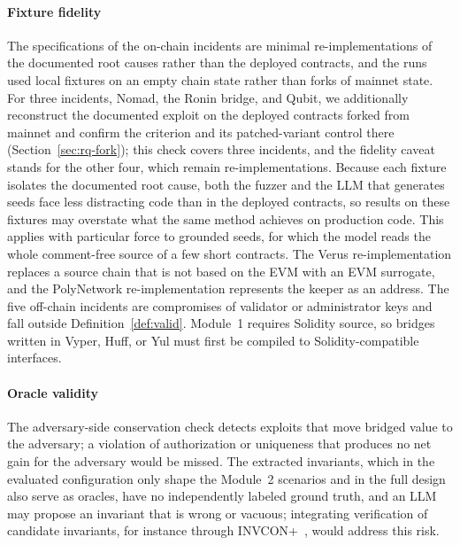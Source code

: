 \documentclass[a4paper]{cas-sc}
\begin{document}
\paragraph{Fixture fidelity}
The specifications of the on-chain incidents are minimal re-implementations of the documented root causes rather than the deployed contracts, and the runs used local fixtures on an empty chain state rather than forks of mainnet state. For three incidents, Nomad, the Ronin bridge, and Qubit, we additionally reconstruct the documented exploit on the deployed contracts forked from mainnet and confirm the criterion and its patched-variant control there (Section~\ref{sec:rq-fork}); this check covers three incidents, and the fidelity caveat stands for the other four, which remain re-implementations. Because each fixture isolates the documented root cause, both the fuzzer and the LLM that generates seeds face less distracting code than in the deployed contracts, so results on these fixtures may overstate what the same method achieves on production code. This applies with particular force to grounded seeds, for which the model reads the whole comment-free source of a few short contracts. The Verus re-implementation replaces a source chain that is not based on the EVM with an EVM surrogate, and the PolyNetwork re-implementation represents the keeper as an address. The five off-chain incidents are compromises of validator or administrator keys and fall outside Definition~\ref{def:valid}. Module~1 requires Solidity source, so bridges written in Vyper, Huff, or Yul must first be compiled to Solidity-compatible interfaces.

\paragraph{Oracle validity}
The adversary-side conservation check detects exploits that move bridged value to the adversary; a violation of authorization or uniqueness that produces no net gain for the adversary would be missed. The extracted invariants, which in the evaluated configuration only shape the Module~2 scenarios and in the full design also serve as oracles, have no independently labeled ground truth, and an LLM may propose an invariant that is wrong or vacuous; integrating verification of candidate invariants, for instance through INVCON+~\citep{liu2025invcon}, would address this risk.
\end{document}
